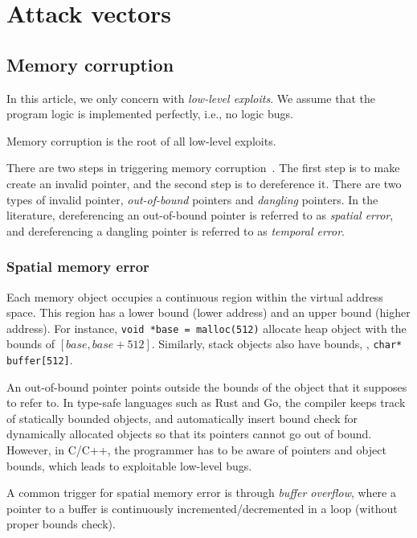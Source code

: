 \documentclass[11pt]{memoir}
\begin{document}
\section{Attack vectors}
\subsection{Memory corruption}
In this article, we only concern with \emph{low-level exploits}. 
We assume that the program logic is implemented perfectly, i.e., no logic bugs.

Memory corruption is the root of all low-level exploits.

There are two steps in triggering memory corruption~\cite{szekeres2013sok}. 
The first step is to make create an invalid pointer, and the second step is to
dereference it. There are two types of invalid pointer, \emph{out-of-bound}
pointers and \emph{dangling} pointers.
In the literature, dereferencing an out-of-bound pointer is referred to as
\emph{spatial error}, and dereferencing a dangling pointer is referred to as
\emph{temporal error}.

\subsubsection{Spatial memory error}
Each memory object occupies a continuous region within the virtual address space.
This region has a lower bound (lower address) and an upper bound (higher address). 
For instance, \texttt{void *base = malloc(512)} allocate heap object with
the bounds of $[base, base + 512]$.
Similarly, stack objects also have bounds, \eg, \texttt{char* buffer[512]}.


An out-of-bound pointer points outside the bounds of the object that it
supposes to refer to.
In type-safe languages such as Rust and Go, the compiler keeps track of
statically bounded objects, and automatically insert bound check for
dynamically allocated objects so that its pointers cannot go out of bound.
However, in C/C++, the programmer has to be aware of pointers and object
bounds, which leads to exploitable low-level bugs.


A common trigger for spatial memory error is through \emph{buffer overflow},
where a pointer to a buffer is continuously incremented/decremented in a loop
(without proper bounds check).
\end{document}
